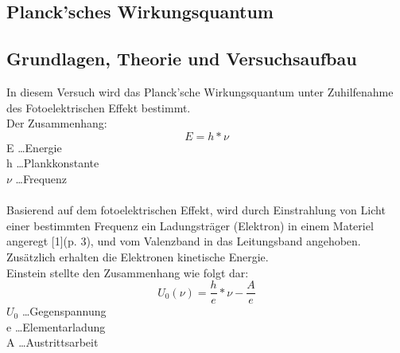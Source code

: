 \documentclass[12pt,a4paper]{article}
\begin{document}
\begin{multicols}{2}




%			



\section{Planck'sches Wirkungsquantum}

\subsection{Grundlagen, Theorie und Versuchsaufbau}

In diesem Versuch wird das Planck'sche Wirkungsquantum unter Zuhilfenahme des Fotoelektrischen Effekt bestimmt.\\
Der Zusammenhang:
$$E = h * \nu$$
E \ldots Energie \\
h \ldots Plankkonstante \\ 
$\nu$ \ldots Frequenz \\
\\
Basierend auf dem fotoelektrischen Effekt, wird durch Einstrahlung von Licht einer bestimmten Frequenz ein Ladungsträger (Elektron) in einem Materiel angeregt [1](p. 3), und vom Valenzband in das Leitungsband angehoben. Zusätzlich erhalten die Elektronen kinetische Energie.\\
Einstein stellte den Zusammenhang wie folgt dar:
$$U_0(\nu) = \frac{h}{e} * \nu - \frac{A}{e}$$
$U_0$ \ldots Gegenspannung\\
e \ldots Elementarladung\\
A \ldots Austrittsarbeit\\


\end{multicols}
\end{document}
